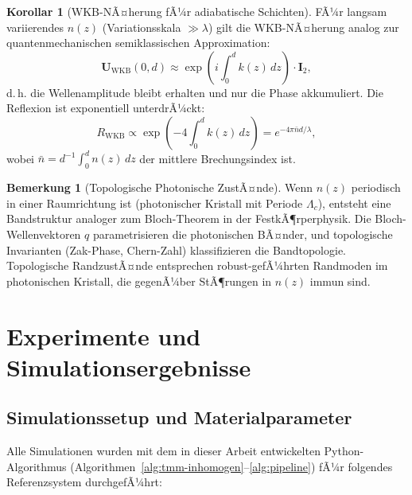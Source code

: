 ﻿\documentclass[a4paper,12pt]{article}
\theoremstyle{definition}
\newtheorem{korollar}{Korollar}[section]
\newtheorem{bemerkung}{Bemerkung}[section]
\newcommand{\matr}[1]{\mathbf{#1}}
\begin{document}
	\begin{korollar}[WKB-NÃ¤herung fÃ¼r adiabatische Schichten]
		\label{kor:wkb}
		FÃ¼r langsam variierendes $n(z)$ (Variationsskala $\gg \lambda$) gilt
		die WKB-NÃ¤herung analog zur quantenmechanischen semiklassischen Approximation:
		\begin{equation}
			\matr{U}_\mathrm{WKB}(0, d) \approx
			\exp\!\left(i\int_0^d k(z)\, dz\right) \cdot \matr{I}_2,
			\label{eq:wkb}
		\end{equation}
		d.\,h. die Wellenamplitude bleibt erhalten und nur die Phase akkumuliert.
		Die Reflexion ist exponentiell unterdrÃ¼ckt:
		\begin{equation}
			R_\mathrm{WKB} \propto \exp\!\left(-4\int_0^d k(z)\, dz\right)
			= e^{-4\pi\bar{n}d/\lambda},
			\label{eq:wkb-reflexion}
		\end{equation}
		wobei $\bar{n} = d^{-1}\int_0^d n(z)\, dz$ der mittlere Brechungsindex ist.
	\end{korollar}
	
	\begin{bemerkung}[Topologische Photonische ZustÃ¤nde]
		Wenn $n(z)$ periodisch in einer Raumrichtung ist (photonischer Kristall
		mit Periode $\Lambda_c$), entsteht eine Bandstruktur analoger zum
		Bloch-Theorem in der FestkÃ¶rperphysik. Die Bloch-Wellenvektoren $q$
		parametrisieren die photonischen BÃ¤nder, und topologische Invarianten
		(Zak-Phase, Chern-Zahl) klassifizieren die Bandtopologie.
		Topologische RandzustÃ¤nde entsprechen robust-gefÃ¼hrten Randmoden im
		photonischen Kristall, die gegenÃ¼ber StÃ¶rungen in $n(z)$ immun sind.
	\end{bemerkung}
	
	\section{Experimente und Simulationsergebnisse}
	\label{sec:experimente}
	
	\subsection{Simulationssetup und Materialparameter}
	
	Alle Simulationen wurden mit dem in dieser Arbeit entwickelten
	Python-Algorithmus (Algorithmen~\ref{alg:tmm-inhomogen}--\ref{alg:pipeline})
	fÃ¼r folgendes Referenzsystem durchgefÃ¼hrt:
	
\end{document}
